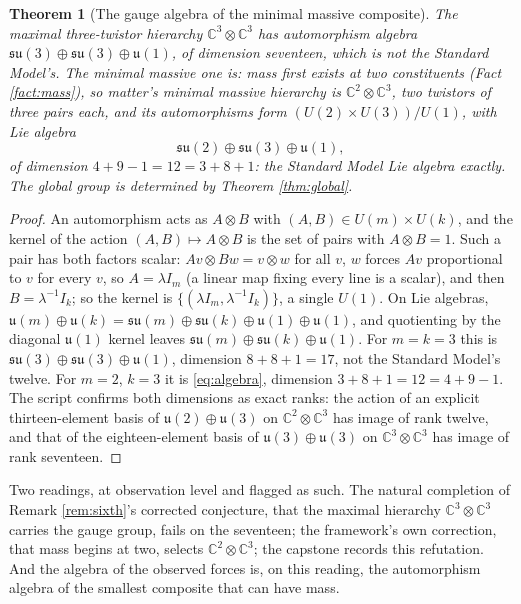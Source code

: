 \documentclass[11pt]{article}
\newtheorem{theorem}{Theorem}[section]
\theoremstyle{definition}
\newcommand{\C}{\mathbb{C}}
\newcommand{\su}{\mathfrak{su}}
\newcommand{\uu}{\mathfrak{u}}
\begin{document}
\begin{theorem}[The gauge algebra of the minimal massive composite]\label{thm:algebra}
The maximal three-twistor hierarchy $\C^{3} \otimes \C^{3}$ has automorphism algebra $\su(3) \oplus \su(3) \oplus \uu(1)$, of dimension seventeen, which is not the Standard Model's. The minimal massive one is: mass first exists at two constituents (Fact \ref{fact:mass}), so matter's \emph{minimal massive} hierarchy is $\C^{2} \otimes \C^{3}$, two twistors of three pairs each, and its automorphisms form $(U(2) \times U(3))/U(1)$, with Lie algebra
\begin{equation}\label{eq:algebra}
\su(2) \oplus \su(3) \oplus \uu(1),
\end{equation}
of dimension $4 + 9 - 1 = 12 = 3 + 8 + 1$: the Standard Model Lie algebra exactly. The global group is determined by Theorem \ref{thm:global}.
\end{theorem}

\begin{proof}
An automorphism acts as $A \otimes B$ with $(A, B) \in U(m) \times U(k)$, and the kernel of the action $(A, B) \mapsto A \otimes B$ is the set of pairs with $A \otimes B = 1$. Such a pair has both factors scalar: $Av \otimes Bw = v \otimes w$ for all $v$, $w$ forces $Av$ proportional to $v$ for every $v$, so $A = \lambda I_{m}$ (a linear map fixing every line is a scalar), and then $B = \lambda^{-1}I_{k}$; so the kernel is $\{(\lambda I_{m}, \lambda^{-1}I_{k})\}$, a single $U(1)$. On Lie algebras, $\uu(m) \oplus \uu(k) = \su(m) \oplus \su(k) \oplus \uu(1) \oplus \uu(1)$, and quotienting by the diagonal $\uu(1)$ kernel leaves $\su(m) \oplus \su(k) \oplus \uu(1)$. For $m = k = 3$ this is $\su(3) \oplus \su(3) \oplus \uu(1)$, dimension $8 + 8 + 1 = 17$, not the Standard Model's twelve. For $m = 2$, $k = 3$ it is \eqref{eq:algebra}, dimension $3 + 8 + 1 = 12 = 4 + 9 - 1$. The script confirms both dimensions as exact ranks: the action of an explicit thirteen-element basis of $\uu(2) \oplus \uu(3)$ on $\C^{2} \otimes \C^{3}$ has image of rank twelve, and that of the eighteen-element basis of $\uu(3) \oplus \uu(3)$ on $\C^{3} \otimes \C^{3}$ has image of rank seventeen.
\end{proof}

Two readings, at observation level and flagged as such. The natural completion of Remark \ref{rem:sixth}'s corrected conjecture, that the maximal hierarchy $\C^{3} \otimes \C^{3}$ carries the gauge group, fails on the seventeen; the framework's own correction, that mass begins at two, selects $\C^{2} \otimes \C^{3}$; the capstone \cite[Table~1]{ButlerT17} records this refutation. And the algebra of the observed forces is, on this reading, the automorphism algebra of the smallest composite that can have mass.
\end{document}
